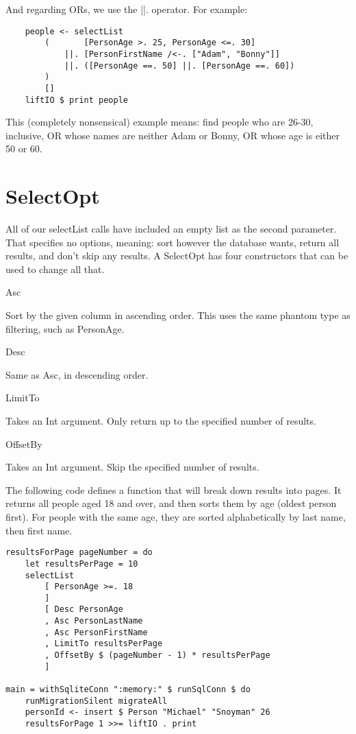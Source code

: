 And regarding ORs, we use the ||. operator. For example:

\begin{lstlisting}
    people <- selectList
        (       [PersonAge >. 25, PersonAge <=. 30]
            ||. [PersonFirstName /<-. ["Adam", "Bonny"]]
            ||. ([PersonAge ==. 50] ||. [PersonAge ==. 60])
        )
        []
    liftIO $ print people
\end{lstlisting}

This (completely nonsensical) example means: find people who are 26-30, inclusive, OR whose names are neither Adam or Bonny, OR whose age is either 50 or 60.

\section{SelectOpt}

All of our selectList calls have included an empty list as the second parameter. That specifies no options, meaning: sort however the database wants, return all results, and don't skip any results. A SelectOpt has four constructors that can be used to change all that.

Asc

Sort by the given column in ascending order. This uses the same phantom type as filtering, such as PersonAge.

Desc

Same as Asc, in descending order.

LimitTo

Takes an Int argument. Only return up to the specified number of results.

OffsetBy

Takes an Int argument. Skip the specified number of results.

The following code defines a function that will break down results into pages. It returns all people aged 18 and over, and then sorts them by age (oldest person first). For people with the same age, they are sorted alphabetically by last name, then first name.

\begin{lstlisting}
resultsForPage pageNumber = do
    let resultsPerPage = 10
    selectList
        [ PersonAge >=. 18
        ]
        [ Desc PersonAge
        , Asc PersonLastName
        , Asc PersonFirstName
        , LimitTo resultsPerPage
        , OffsetBy $ (pageNumber - 1) * resultsPerPage
        ]

main = withSqliteConn ":memory:" $ runSqlConn $ do
    runMigrationSilent migrateAll
    personId <- insert $ Person "Michael" "Snoyman" 26
    resultsForPage 1 >>= liftIO . print
\end{lstlisting}

